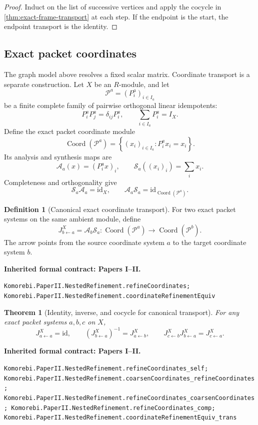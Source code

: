 \documentclass[11pt,a4paper]{article}
\newtheorem{theorem}{Theorem}[section]
\theoremstyle{plain}
\theoremstyle{definition}
\newtheorem{definition}[definition]{Definition}
\theoremstyle{remark}
\newcommand{\cA}{\mathcal A}
\newcommand{\cP}{\mathcal P}
\newcommand{\cS}{\mathcal S}
\newcommand{\id}{\mathrm{id}}
\newcommand{\Coord}{\operatorname{Coord}}
\newcommand{\leanname}[1]{\nolinkurl{#1}}
\newcommand{\statusleanprior}[1]{\par\smallskip\noindent\begin{minipage}{\linewidth}{\color{leanblue}\textbf{Inherited formal contract: Papers I--II.}}\par\begingroup\small\raggedright\leanname{#1}\par\endgroup\end{minipage}\par\smallskip}
\begin{document}
\begin{proof}
Induct on the list of successive vertices and apply the cocycle in
\cref{thm:exact-frame-transport} at each step.  If the endpoint is the start,
the endpoint transport is the identity.
\end{proof}

\subsection{Exact packet coordinates}

The graph model above resolves a fixed scalar matrix.  Coordinate transport
is a separate construction.  Let $X$ be an $R$-module, and let
\[
\cP^a=(P^a_i)_{i\in I_a}
\]
be a finite complete family of pairwise orthogonal linear idempotents:
\[
P^a_iP^a_j=\delta_{ij}P^a_i,
\qquad
\sum_{i\in I_a}P^a_i=I_X.
\]
Define the exact packet coordinate module
\[
\Coord(\cP^a)
=
\left\{(x_i)_{i\in I_a}:P^a_ix_i=x_i\right\}.
\]
Its analysis and synthesis maps are
\[
\cA_a(x)=(P^a_ix)_i,
\qquad
\cS_a((x_i)_i)=\sum_ix_i.
\]
Completeness and orthogonality give
\[
\cS_a\cA_a=\id_X,
\qquad
\cA_a\cS_a=\id_{\Coord(\cP^a)}.
\]

\begin{definition}[Canonical exact coordinate transport]
\label{def:canonical-J}
For two exact packet systems on the same ambient module, define
\[
  J^X_{b\leftarrow a}
  =
  \cA_b\cS_a:
  \Coord(\cP^a)\longrightarrow\Coord(\cP^b).
\]
The arrow points from the source coordinate system $a$ to the target
coordinate system $b$.
\end{definition}
\statusleanprior{Komorebi.PaperII.NestedRefinement.refineCoordinates; Komorebi.PaperII.NestedRefinement.coordinateRefinementEquiv}

\begin{theorem}[Identity, inverse, and cocycle for canonical transport]
\label{thm:J-cocycle}
For any exact packet systems $a,b,c$ on $X$,
\[
J^X_{a\leftarrow a}=\id,
\qquad
\left(J^X_{b\leftarrow a}\right)^{-1}=J^X_{a\leftarrow b},
\qquad
J^X_{c\leftarrow b}J^X_{b\leftarrow a}=J^X_{c\leftarrow a}.
\]
\end{theorem}
\statusleanprior{Komorebi.PaperII.NestedRefinement.refineCoordinates_self; Komorebi.PaperII.NestedRefinement.coarsenCoordinates_refineCoordinates; Komorebi.PaperII.NestedRefinement.refineCoordinates_coarsenCoordinates; Komorebi.PaperII.NestedRefinement.refineCoordinates_comp; Komorebi.PaperII.NestedRefinement.coordinateRefinementEquiv_trans}
\end{document}
